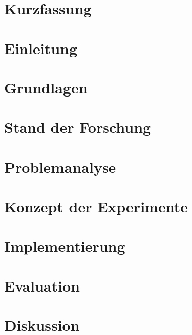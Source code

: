 \documentclass[12pt,a4paper,twoside,openright]{report}
\title{\ProjectTitle}
\author{\ProjectAuthor}
\date{\today}
\begin{document}
	\hypersetup{pageanchor=false}
	
	\ifdefined\PrintVersion
	\begingroup
	\pagestyle{empty}
	\cleardoublepage
	\endgroup
	\else
	\clearpage
	\fi
	\hypersetup{pageanchor=true}
	\chapter*{Kurzfassung}
	\label{chap:abstract}
	
	\tableofcontents

	\clearpage

	\chapter{Einleitung}
	\label{chap:einleitung}
	

	\chapter{Grundlagen}
	\label{chap:grundlagen}
	

	\chapter{Stand der Forschung}
	\label{chap:stand-der-forschung}
	

	\chapter{Problemanalyse}
	\label{chap:problemanalyse}
	

	\chapter{Konzept der Experimente}
	\label{chap:concept}
	

	\chapter{Implementierung}
	\label{chap:implementation}
	

	\chapter{Evaluation}
	\label{chap:evaluation}
	

	\chapter{Diskussion}
	\label{chap:discussion}
	
\end{document}
